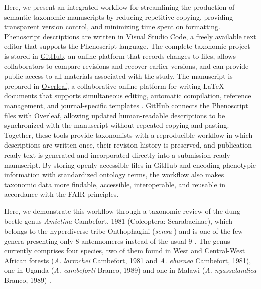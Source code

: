 Here, we present an integrated workflow for streamlining the production of semantic taxonomic manuscripts by reducing repetitive copying, providing transparent version control, and minimizing time spent on formatting. Phenoscript descriptions are written in \href{https://code.visualstudio.com/}{Visual Studio Code}, a freely available text editor that supports the Phenoscript language. The complete taxonomic project is stored in \href{https://github.com/}{GitHub}, an online platform that records changes to files, allows collaborators to compare revisions and recover earlier versions, and can provide public access to all materials associated with the study. The manuscript is prepared in \href{https://www.overleaf.com/}{Overleaf}, a collaborative online platform for writing LaTeX documents that supports simultaneous editing, automatic compilation, reference management, and journal-specific templates \citep{sanchez_egea_garcia_vilana_gonzalez_rojas_napoles_alberro_2026}. GitHub connects the Phenoscript files with Overleaf, allowing updated human-readable descriptions to be synchronized with the manuscript without repeated copying and pasting. Together, these tools provide taxonomists with a reproducible workflow in which descriptions are written once, their revision history is preserved, and publication-ready text is generated and incorporated directly into a submission-ready  manuscript. By storing openly accessible files in GitHub and encoding phenotypic information with standardized ontology terms, the workflow also makes taxonomic data more findable, accessible, interoperable, and reusable in accordance with the FAIR principles.








Here, we demonstrate this workflow through a taxonomic review of the dung beetle genus \textit{Amietina} Cambefort, 1981 (Coleoptera: Scarabaeinae), which belongs to the hyperdiverse tribe Onthophagini (\textit{sensu} \citealp{Montanaro2026.07.22.740134}) and is one of the few genera presenting only 8 antennomeres instead of the usual 9 \citep{branco1992essai, cambefort1981amietina, cambefort1979donnees, cambefort1986une, deschodt2023new}. 
The genus currently comprises four species, two of them found in West and Central-West African forests (\textit{A. larrochei} Cambefort, 1981 and \textit{A. eburnea} Cambefort, 1981), one in Uganda (\textit{A. cambeforti} Branco, 1989) and one in Malawi (\textit{A. nyassalandica} Branco, 1989) \citep{branco1989deux, cambefort1981amietina}.


